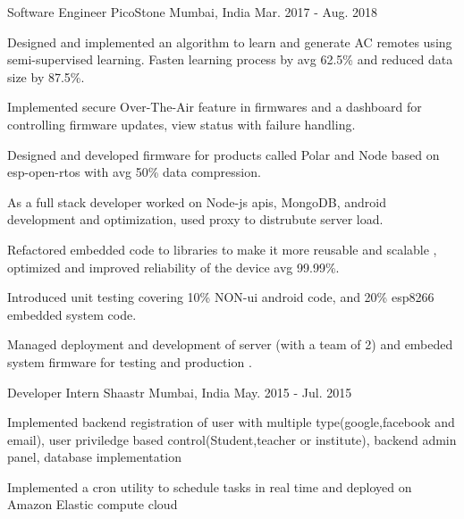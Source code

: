 

\begin{cventries}

	\cventry
	{Software Engineer} %
	{PicoStone} %
	{Mumbai, India} %
	{Mar. 2017 - Aug. 2018} %
	{ \begin{cvitems} %
			\item{Designed and implemented an algorithm to learn and generate AC remotes using semi-supervised learning. Fasten learning process by avg 62.5\% and reduced data size by 87.5\%.} %
      \item {Implemented secure Over-The-Air  feature in firmwares and a dashboard for controlling firmware updates, view status with failure handling.}
      \item {Designed and developed firmware for products called Polar and Node based on esp-open-rtos with avg 50\% data compression.}  %
      \item {As a full stack developer worked on Node-js apis, MongoDB, android development and optimization, used proxy to distrubute server load.}    
      \item {Refactored embedded code to libraries to make it more reusable and scalable , optimized and improved reliability of the device avg 99.99\%.}  %
      \item {Introduced unit testing covering 10\% NON-ui android code, and 20\% esp8266 embedded system code.}
      \item {Managed deployment and development of server (with a team of 2) and embeded system firmware for testing and production .}
     \end{cvitems}
  }


	\cventry
	{Developer Intern} %
	{Shaastr } %
	{Mumbai, India} %
	{May. 2015 - Jul. 2015} %
	{
		\begin{cvitems} %
			\item {Implemented backend registration of user with multiple type(google,facebook and email), user priviledge based control(Student,teacher or institute), backend admin panel, database implementation}
			\item {Implemented a cron utility to schedule tasks in real time and deployed on Amazon Elastic compute cloud}
		\end{cvitems}
	}

\end{cventries}
